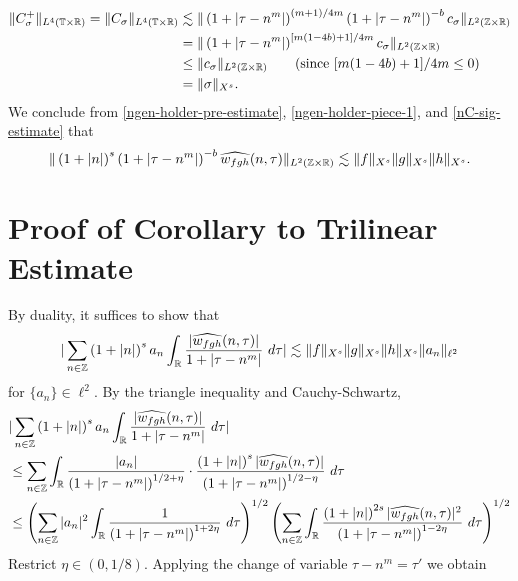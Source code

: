 \begin{equation}
	\label{nC-sig-estimate}
	\begin{split}
		\| C^+_\sigma \|_{L^4(\mathbb{T} \times \mathbb{R})} = \|C_\sigma \|_{L^4(\mathbb{T} \times \mathbb{R})} 
		& \lesssim \|\left( 1 + | \tau - n^{m } | 
		\right)^{(m +1)/4m} \left( 1 + | \tau - n^{m } | 
		\right)^{-b} c_\sigma \|_{L^2(\mathbb{Z} \times \mathbb{R})}
		\\
		& = \|\left( 1 + | \tau - n^{m } | 
		\right)^{[m(1 - 4b) + 1]/4m } c_\sigma \|_{L^2(\mathbb{Z} \times \mathbb{R})}
		\\
		& \le \|c_\sigma \|_{L^2(\mathbb{Z} \times \mathbb{R})}  \qquad (\text{since  } [m(1 - 4b) + 
		1]/4m \le 0)
		\\
		& = \|\sigma\|_{X^s}.
	\end{split}
\end{equation}
%
%
We conclude from \eqref{ngen-holder-pre-estimate}, \eqref{ngen-holder-piece-1}, 
and \eqref{nC-sig-estimate} that
%
%
%
%
\begin{equation*}
	\begin{split}
		\| \left( 1 + |n | \right)^s \left( 1 + | \tau - n^{m} | \right)^{-b} \widehat{w_{fgh}} 
		(n, \tau) \|_{L^2(\mathbb{Z} \times \mathbb{R})} \lesssim 
		\|f\|_{X^s}\|g\|_{X^s}\|h\|_{X^s}.
	\end{split}
\end{equation*}
%
%
%
%
%
%
%
\section{Proof of Corollary to Trilinear Estimate}
By duality, it suffices to show that 
%
\begin{equation*}
	\begin{split}
		| \sum_{n \in \mathbb{Z}} \left (1 + |n| \right )^{s}
		a_n \int_{\mathbb{R}} \frac{|\widehat{w_{fgh}}(n, \tau)|}{1 
		+ | \tau - n^{m } |} \ d \tau | \lesssim \|f\|_{X^s} \|g\|_{X^s} \|h\|_{X^s}
		\|a_n \|_{\ell^2}
	\end{split}
\end{equation*}
%
for $\{a_n\} \in \ell^2$. By the triangle inequality 
and Cauchy-Schwartz,
%
\begin{equation}
	\label{n1m}
	\begin{split}
		& | \sum_{n \in \mathbb{Z}} \left (1 + |n| \right )^{s} a_n
		\int_{\mathbb{R}}\frac{| \widehat{w_{fgh}}(n, \tau) |}{1 + | \tau - n^{m } |} \ d \tau |
		\\
		& \le \sum_{n \in \mathbb{Z}} \int_{\mathbb{R}} \frac{| a_n |}{\left( 1 + 
		| \tau - n^{m } |
		\right)^{1/2 + \eta}} \cdot \frac{\left( 1 + | n| \right)^s  |
		\widehat{w_{fgh}}(n, \tau) |}{\left( 
		1 + | \tau - n^{m } | \right)^{1/2 - \eta}} \ d \tau
		\\
		& \le \left( \sum_{n \in \mathbb{Z}} | a_{n} |^2\int_{\mathbb{R}} \frac{1}{\left( 1 + | \tau - n^{m } | \right)^{1 + 2 \eta}} \ d \tau  
		\right)^{1/2} 
		\left ( \sum_{n \in \mathbb{Z}}\int_{\mathbb{R}} \frac{\left (1 + |n| \right )^{2s} | \widehat{w_{fgh}}(n, \tau) 
		|^2}{\left( 1 + | \tau - n^{m } | \right)^{1 - 2 \eta}}\ d \tau 
		\right)^{1/2}
	\end{split}
\end{equation}
%
Restrict $\eta \in (0, 1/8)$. Applying the change of variable $\tau - n^{m }
= \tau'$ we obtain  %

